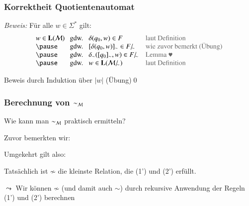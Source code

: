 \documentclass[onlymath]{beamer}
\begin{document}
\begin{frame}\frametitle{Korrektheit Quotientenautomat}


\emph{Beweis:}
Für alle $w\in\Sigma^*$ gilt:
\[\begin{array}{l@{~~\text{ gdw. }~~}ll}
 w\in \Slang{L}(\Smach{M})
	& \delta(q_0,w)\in F & \textcolor{devilscss}{\text{laut Definition}}\\\pause
	& [\delta(q_0,w)]_\sim\in \simquot{F} & \textcolor{devilscss}{\text{wie zuvor bemerkt (Übung)}} \\\pause
	& \delta_\sim([q_0]_\sim,w)\in \simquot{F} & \textcolor{devilscss}{\text{Lemma $\varheartsuit$}}\\\pause
	& w\in \Slang{L}(\simquot{\Smach{M}}) & \textcolor{devilscss}{\text{laut Definition}}
\end{array}
\]\pause


Beweis durch Induktion über $|w|$ (Übung)\qed

\end{frame}


\begin{frame}\frametitle{Berechnung von $\sim_{\mathcal{M}}$}

\alert{Wie kann man $\sim_{\mathcal{M}}$ praktisch ermitteln?}
\bigskip 

Zuvor bemerkten wir:
%
\bigskip 

Umgekehrt gilt also:
%
\bigskip 

Tatsächlich ist $\not\sim$ die \alert{kleinste Relation}, die (1') und (2') erfüllt.
\medskip

$\leadsto$ Wir können $\not\sim$ (und damit auch $\sim$) durch rekursive Anwendung der Regeln (1') und (2') berechnen


\end{frame}
\end{document}
